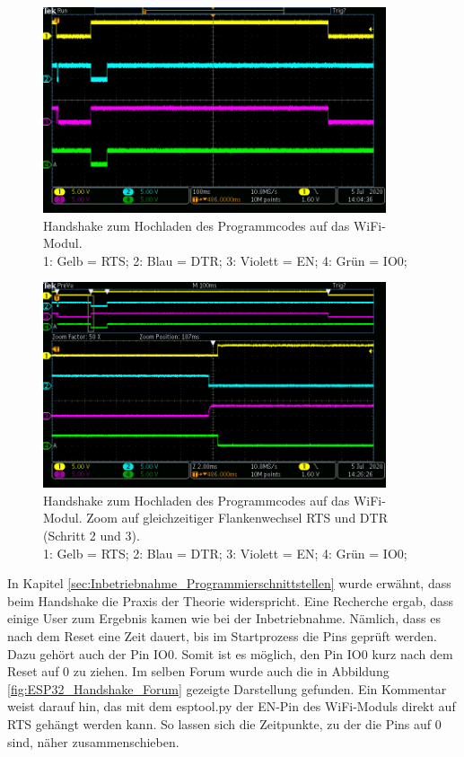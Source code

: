 \begin{figure}[H]
\center
\includegraphics[width = 0.9\textwidth]{graphics/ESP32_RTS_DTR_EN_IO0_gesamt}
\caption{Handshake zum Hochladen des Programmcodes auf das WiFi-Modul. \\\hspace{\textwidth}1: Gelb = RTS; 2: Blau = DTR; 3: Violett = EN; 4: Grün = IO0;}
\label{fig:ESP32_RTS_DTR_EN_IO0_gesamt}
\end{figure}

\begin{figure}[H]
\center
\includegraphics[width = 0.9\textwidth]{graphics/ESP32_RTS_DTR_EN_IO0_2}
\caption{Handshake zum Hochladen des Programmcodes auf das WiFi-Modul. Zoom auf gleichzeitiger Flankenwechsel RTS und DTR (Schritt 2 und 3).\\\hspace{\textwidth}1: Gelb = RTS; 2: Blau = DTR; 3: Violett = EN; 4: Grün = IO0;}
\label{fig:ESP32_RTS_DTR_EN_IO0_2}
\end{figure}


In Kapitel \ref{sec:Inbetriebnahme_Programmierschnittstellen} wurde erwähnt, dass beim Handshake die Praxis der Theorie widerspricht. Eine Recherche ergab, dass einige User zum Ergebnis kamen wie bei der Inbetriebnahme. Nämlich, dass es nach dem Reset eine Zeit dauert, bis im Startprozess die Pins geprüft werden. Dazu gehört auch der Pin IO0. Somit ist es möglich, den Pin IO0 kurz nach dem Reset auf 0 zu ziehen.
Im selben Forum wurde auch die in Abbildung \ref{fig:ESP32_Handshake_Forum} gezeigte Darstellung gefunden. Ein Kommentar weist darauf hin, das mit dem esptool.py der EN-Pin des WiFi-Moduls direkt auf RTS gehängt werden kann. So lassen sich die Zeitpunkte, zu der die Pins auf 0 sind, näher zusammenschieben. \cite{liudr_trying_2017}

